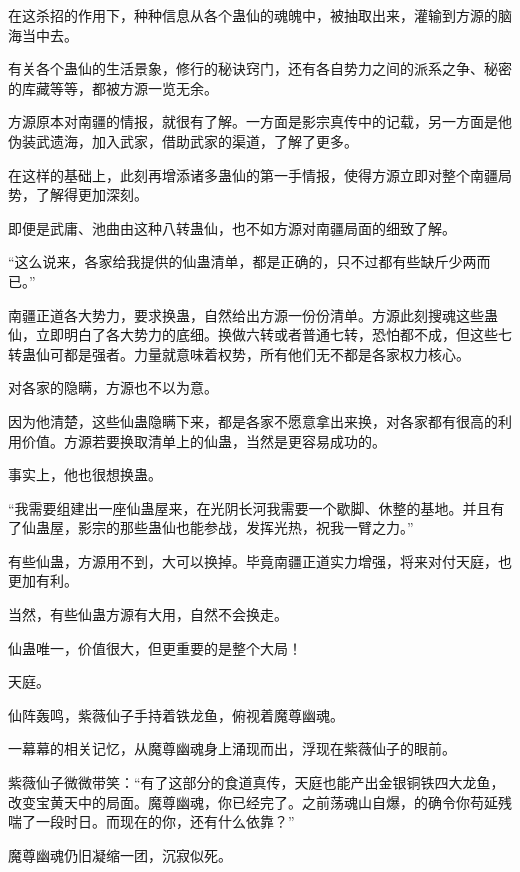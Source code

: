 \begin{this_body}
在这杀招的作用下，种种信息从各个蛊仙的魂魄中，被抽取出来，灌输到方源的脑海当中去。

有关各个蛊仙的生活景象，修行的秘诀窍门，还有各自势力之间的派系之争、秘密的库藏等等，都被方源一览无余。

方源原本对南疆的情报，就很有了解。一方面是影宗真传中的记载，另一方面是他伪装武遗海，加入武家，借助武家的渠道，了解了更多。

在这样的基础上，此刻再增添诸多蛊仙的第一手情报，使得方源立即对整个南疆局势，了解得更加深刻。

即便是武庸、池曲由这种八转蛊仙，也不如方源对南疆局面的细致了解。

“这么说来，各家给我提供的仙蛊清单，都是正确的，只不过都有些缺斤少两而已。”

南疆正道各大势力，要求换蛊，自然给出方源一份份清单。方源此刻搜魂这些蛊仙，立即明白了各大势力的底细。换做六转或者普通七转，恐怕都不成，但这些七转蛊仙可都是强者。力量就意味着权势，所有他们无不都是各家权力核心。

对各家的隐瞒，方源也不以为意。

因为他清楚，这些仙蛊隐瞒下来，都是各家不愿意拿出来换，对各家都有很高的利用价值。方源若要换取清单上的仙蛊，当然是更容易成功的。

事实上，他也很想换蛊。

“我需要组建出一座仙蛊屋来，在光阴长河我需要一个歇脚、休整的基地。并且有了仙蛊屋，影宗的那些蛊仙也能参战，发挥光热，祝我一臂之力。”

有些仙蛊，方源用不到，大可以换掉。毕竟南疆正道实力增强，将来对付天庭，也更加有利。

当然，有些仙蛊方源有大用，自然不会换走。

仙蛊唯一，价值很大，但更重要的是整个大局！

天庭。

仙阵轰鸣，紫薇仙子手持着铁龙鱼，俯视着魔尊幽魂。

一幕幕的相关记忆，从魔尊幽魂身上涌现而出，浮现在紫薇仙子的眼前。

紫薇仙子微微带笑：“有了这部分的食道真传，天庭也能产出金银铜铁四大龙鱼，改变宝黄天中的局面。魔尊幽魂，你已经完了。之前荡魂山自爆，的确令你苟延残喘了一段时日。而现在的你，还有什么依靠？”

魔尊幽魂仍旧凝缩一团，沉寂似死。

\end{this_body}

